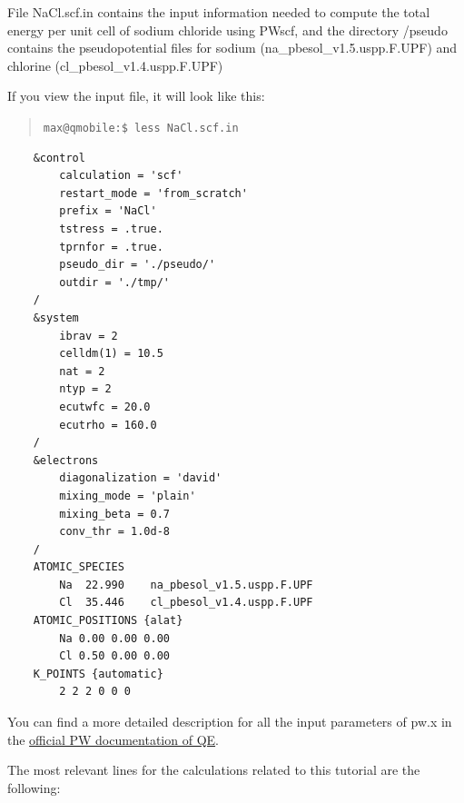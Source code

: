\documentclass[12pt]{article}
\def\red#1{\textcolor{red}{#1}}
\begin{document}
    File NaCl.scf.in contains the input information needed to compute the total energy
    per unit cell of sodium chloride using PWscf, and the directory /pseudo contains the pseudopotential files for sodium (na\_pbesol\_v1.5.uspp.F.UPF) and chlorine (cl\_pbesol\_v1.4.uspp.F.UPF)
    
    If you view the input file, it will look like this:

    \begin{quotation}
        \noindent
        {\tt max@qmobile:\$ less NaCl.scf.in } 
    \end{quotation}
    \begin{verbatim}
    &control
        calculation = 'scf'
        restart_mode = 'from_scratch'
        prefix = 'NaCl'
        tstress = .true.
        tprnfor = .true.
        pseudo_dir = './pseudo/'
        outdir = './tmp/'
    /
    &system
        ibrav = 2
        celldm(1) = 10.5
        nat = 2
        ntyp = 2
        ecutwfc = 20.0
        ecutrho = 160.0
    /
    &electrons
        diagonalization = 'david'
        mixing_mode = 'plain'
        mixing_beta = 0.7
        conv_thr = 1.0d-8
    /
    ATOMIC_SPECIES
        Na  22.990    na_pbesol_v1.5.uspp.F.UPF
        Cl  35.446    cl_pbesol_v1.4.uspp.F.UPF
    ATOMIC_POSITIONS {alat} 
        Na 0.00 0.00 0.00
        Cl 0.50 0.00 0.00
    K_POINTS {automatic}
        2 2 2 0 0 0
    \end{verbatim}

    You can find a more detailed description for all the input parameters of pw.x in the
    \href{https://www.quantum-espresso.org/Doc/INPUT\_PW.html\#idm1099}
    {official PW documentation of QE}. 

    \vspace{10mm}
    The most relevant lines for the calculations related to this tutorial are the following:
\end{document}

